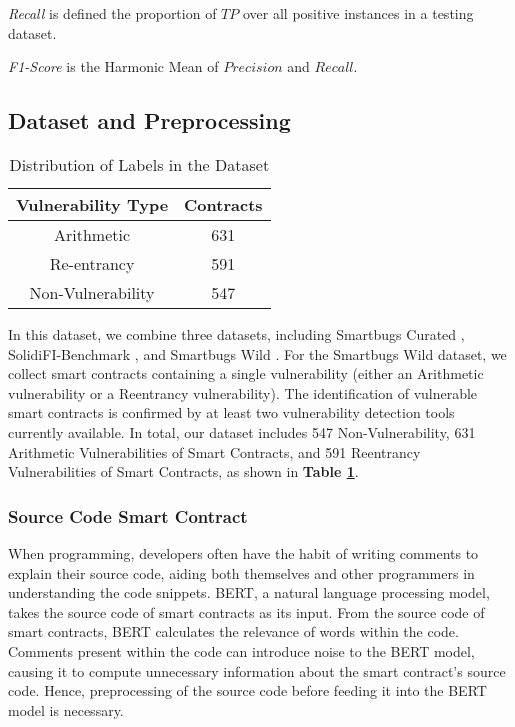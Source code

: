 \textit{Recall} is defined the proportion of $TP$ over all positive instances in a testing dataset.

\textit{F1-Score} is the Harmonic Mean of $Precision$ and $Recall$.

\subsection{Dataset and Preprocessing} \label{subsec:dataset}
\begin{table}[h]
    \caption{Distribution of Labels in the Dataset}\label{tab:dataset}
    \begin{center}
    \begin{tabular}{|c|c|}
      \hline Vulnerability Type  & Contracts \\  \hline
      Arithmetic & 631\\
      Re-entrancy & 591\\
      Non-Vulnerability & 547\\
      \hline
    \end{tabular}
    \end{center} 
\end{table}
In this dataset, we combine three datasets, including Smartbugs Curated \cite{durieux2020empirical, ferreira2020smartbugs}, SolidiFI-Benchmark \cite{ghaleb2020effective}, and Smartbugs Wild \cite{durieux2020empirical, ferreira2020smartbugs}. For the Smartbugs Wild dataset, we collect smart contracts containing a single vulnerability (either an Arithmetic vulnerability or a Reentrancy vulnerability). The identification of vulnerable smart contracts is confirmed by at least two vulnerability detection tools currently available. In total, our dataset includes 547 Non-Vulnerability, 631 Arithmetic Vulnerabilities of Smart Contracts, and 591 Reentrancy Vulnerabilities of Smart Contracts, as shown in \textbf{Table \ref{tab:dataset}}.

\subsubsection{Source Code Smart Contract}
When programming, developers often have the habit of writing comments to explain their source code, aiding both themselves and other programmers in understanding the code snippets. BERT, a natural language processing model, takes the source code of smart contracts as its input. From the source code of smart contracts, BERT calculates the relevance of words within the code. Comments present within the code can introduce noise to the BERT model, causing it to compute unnecessary information about the smart contract's source code. Hence, preprocessing of the source code before feeding it into the BERT model is necessary.

